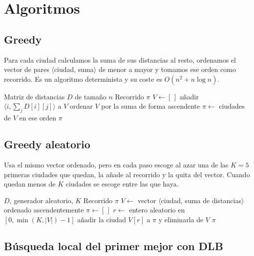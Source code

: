 \section{Algoritmos}

\subsection{Greedy}

Para cada ciudad calculamos la suma de sus distancias al resto, ordenamos el vector de pares $\langle$ciudad, suma$\rangle$ de menor a mayor y tomamos ese orden como recorrido. Es un algoritmo determinista y su coste es $O(n^2 + n \log n)$.

\begin{algorithm}[H]
\caption{Greedy}
\begin{algorithmic}[1]
\Require Matriz de distancias $D$ de tamaño $n$
\Ensure Recorrido $\pi$
\State $V \gets [\,]$
    \State añadir $\langle i, \sum_{j} D[i][j] \rangle$ a $V$
\EndFor
\State ordenar $V$ por la suma de forma ascendente
\State $\pi \gets$ ciudades de $V$ en ese orden
\State \Return $\pi$
\end{algorithmic}
\end{algorithm}

\subsection{Greedy aleatorio}

Usa el mismo vector ordenado, pero en cada paso escoge al azar una de las $K = 5$ primeras ciudades que quedan, la añade al recorrido y la quita del vector. Cuando quedan menos de $K$ ciudades se escoge entre las que haya.

\begin{algorithm}[H]
\caption{Greedy aleatorio}
\begin{algorithmic}[1]
\Require $D$, generador aleatorio, $K$
\Ensure Recorrido $\pi$
\State $V \gets$ vector $\langle$ciudad, suma de distancias$\rangle$ ordenado ascendentemente
\State $\pi \gets [\,]$
    \State $r \gets$ entero aleatorio en $[0, \min(K, |V|) - 1]$
    \State añadir la ciudad $V[r]$ a $\pi$ y eliminarla de $V$
\EndWhile
\State \Return $\pi$
\end{algorithmic}
\end{algorithm}

\subsection{Búsqueda local del primer mejor con DLB}

